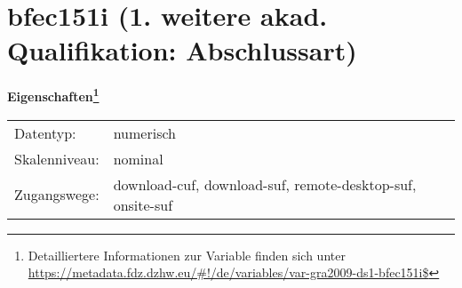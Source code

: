 
    \setcounter{footnote}{0}

    \vspace*{-1.8cm}
	\section{bfec151i (1. weitere akad. Qualifikation: Abschlussart)}
	\label{section:bfec151i}



    \vspace*{0.5cm}
    \noindent\textbf{Eigenschaften\footnote{Detailliertere Informationen zur Variable finden sich unter
		\url{https://metadata.fdz.dzhw.eu/\#!/de/variables/var-gra2009-ds1-bfec151i$}}}\\
	\begin{tabularx}{\hsize}{@{}lX}
	Datentyp: & numerisch \\
	Skalenniveau: & nominal \\
	Zugangswege: &
	  download-cuf, 
	  download-suf, 
	  remote-desktop-suf, 
	  onsite-suf
 \\
    \end{tabularx}



